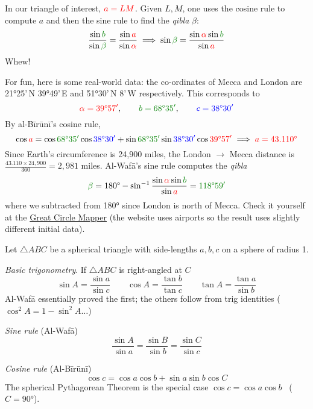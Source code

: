 In our triangle of interest, $\textcolor{red}{a=LM}$. Given $L,M$, one uses the cosine rule to compute $a$ and then the sine rule to find the \emph{qibla} $\beta$:
\[
	\frac{\sin \textcolor{Green}{b}}{\sin\textcolor{Green}{\beta}}=\frac{\sin \textcolor{red}{a}}{\sin\textcolor{red}{\alpha}} \implies \sin\textcolor{Green}{\beta}= \frac{\sin\textcolor{red}{\alpha}\sin\textcolor{Green}{b}}{\sin \textcolor{red}{a}}
\]
Whew!\medbreak

For fun, here is some real-world data: the co-ordinates of Mecca and London are \ang{21}25'\,N \ang{39}49'\,E and \ang{51}30'\,N 8'\,W respectively. This corresponds to
\[
	\textcolor{red}{\alpha=\ang{39}57'},\qquad \textcolor{Green}{b=\ang{68}35'},\qquad \textcolor{blue}{c=\ang{38}30'}
\]
By al-Bīrūnī's cosine rule,
\[
	\cos\textcolor{red}{a} =\cos \textcolor{Green}{\ang{68}35'}\cos \textcolor{blue}{\ang{38}30'}+\sin \textcolor{Green}{\ang{68}35'}\sin\textcolor{blue}{\ang{38}30'}\cos \textcolor{red}{\ang{39}57'} \implies \textcolor{red}{a=\ang{43.110}}
\]
Since Earth's circumference is 24,900 miles, the London $\to$ Mecca distance is $\frac{43.110\times 24,900}{360}=2,981$ miles. Al-Wafā's sine rule computes the \emph{qibla}
\[
	\textcolor{Green}{\beta}=\ang{180} -\sin^{-1}\frac{\sin\textcolor{red}{\alpha}\sin\textcolor{Green}{b}}{\sin \textcolor{red}{a}}=\textcolor{Green}{\ang{118}59'}
\]
where we subtracted from \ang{180} since London is north of Mecca. Check it yourself at the \href{http://www.gcmap.com/mapui?P=LON-QCA}{Great Circle Mapper} (the website uses airports so the result uses slightly different initial data).

\goodbreak


Let $\triangle ABC$ be a spherical triangle with side-lengths $a,b,c$ on a sphere of radius 1.\medbreak

\emph{Basic trigonometry}. If $\triangle ABC$ is right-angled at $C$
\[
	\sin A=\frac{\sin a}{\sin c}\qquad \cos A=\frac{\tan b}{\tan c}\qquad \tan A=\frac{\tan a}{\sin b}
\]
Al-Wafā essentially proved the first; the others follow from trig identities ($\cos^2A=1-\sin^2A\ldots$)\medbreak

\emph{Sine rule} (Al-Wafā)
\[
	\frac{\sin A}{\sin a}=\frac{\sin B}{\sin b}=\frac{\sin C}{\sin c}
\]

\emph{Cosine rule} (Al-Bīrūnī)
\[
	\cos c=\cos a\cos b+\sin a\sin b\cos C
\]
The spherical Pythagorean Theorem is the special case $\cos c=\cos a\cos b$ \ ($C=\ang{90}$).\medbreak

